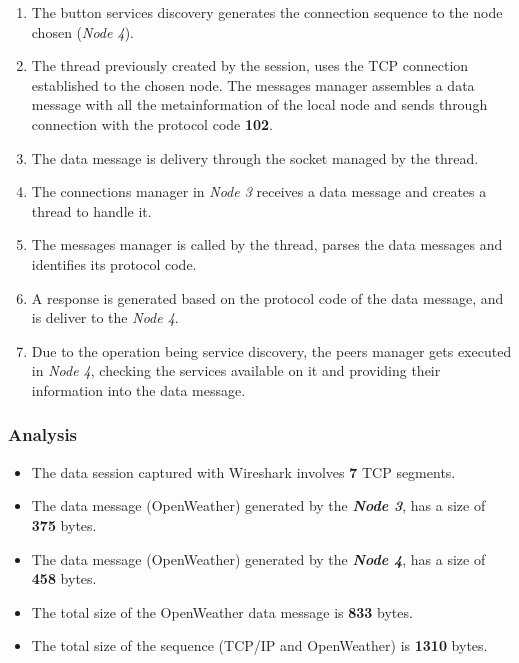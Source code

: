 \begin{enumerate}

\item The button services discovery generates the  connection sequence to the node chosen (\emph{Node 4}).

\item The thread previously created by the session, uses the \gls{TCP} connection established  to the chosen node. The messages manager assembles a data message with all the metainformation of the local node and sends through connection with the protocol code \textbf{102}.

\item The data message is delivery through the socket managed by the thread.

\item The connections manager in \emph{Node 3} receives a data message and creates a thread to handle it.

\item The messages manager is called by the thread, parses the data messages and identifies its protocol code.

\item A response is generated based on the protocol code of the data message, and is deliver to the \emph{Node 4}.

\item Due to the operation being service discovery, the peers manager gets executed in \emph{Node 4}, checking the services available on it and providing their information into the data message.

\end{enumerate}


\subsubsection{Analysis}

\begin{itemize}
\item The data session captured with Wireshark involves \textbf{7} \gls{TCP} segments. 
\item The data message (OpenWeather) generated by the \textbf{\emph{Node 3}}, has a size of \textbf{375} bytes.
\item The data message (OpenWeather) generated by the \textbf{\emph{Node 4}}, has a size of \textbf{458} bytes.
\item The total size of the OpenWeather data message is \textbf{833} bytes.
\item The total size of the sequence (\gls{TCP}/\gls{IP} and OpenWeather) is \textbf{1310} bytes. 
\end{itemize}
 
